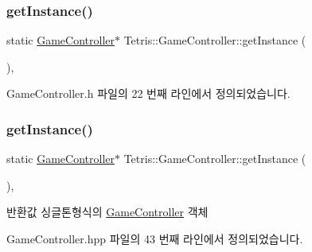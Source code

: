 \subsubsection{\texorpdfstring{get\+Instance()}{getInstance()}\hspace{0.1cm}{\footnotesize\ttfamily [1/2]}}
{\footnotesize\ttfamily static \hyperlink{class_tetris_1_1_game_controller}{Game\+Controller}$\ast$ Tetris\+::\+Game\+Controller\+::get\+Instance (\begin{DoxyParamCaption}{ }\end{DoxyParamCaption})\hspace{0.3cm}{\ttfamily [inline]}, {\ttfamily [static]}}



Game\+Controller.\+h 파일의 22 번째 라인에서 정의되었습니다.

\mbox{\label{class_tetris_1_1_game_controller_af996b3264a1ed606a89be9e72310e569}} 
\subsubsection{\texorpdfstring{get\+Instance()}{getInstance()}\hspace{0.1cm}{\footnotesize\ttfamily [2/2]}}
{\footnotesize\ttfamily static \hyperlink{class_tetris_1_1_game_controller}{Game\+Controller}$\ast$ Tetris\+::\+Game\+Controller\+::get\+Instance (\begin{DoxyParamCaption}{ }\end{DoxyParamCaption})\hspace{0.3cm}{\ttfamily [inline]}, {\ttfamily [static]}}

\begin{DoxyReturn}{반환값}
싱글톤형식의 \hyperlink{class_tetris_1_1_game_controller}{Game\+Controller} 객체 
\end{DoxyReturn}


Game\+Controller.\+hpp 파일의 43 번째 라인에서 정의되었습니다.

\mbox{\label{class_tetris_1_1_game_controller_ad88f3362af23d87282ee8ed39394054d}} 

